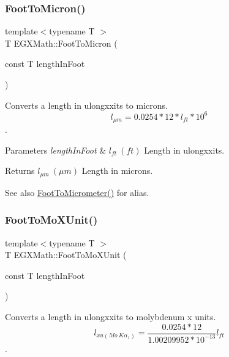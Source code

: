 \subsubsection{\texorpdfstring{Foot\+To\+Micron()}{FootToMicron()}}
{\footnotesize\ttfamily template$<$typename T $>$ \\
T E\+G\+X\+Math\+::\+Foot\+To\+Micron (\begin{DoxyParamCaption}\item[{const T}]{length\+In\+Foot }\end{DoxyParamCaption})}



Converts a length in ulongxxits to microns. \[ l_{\mu m}=0.0254 * 12 * l_{ft} * 10^{6} \]. 


\begin{DoxyParams}{Parameters}
{\em length\+In\+Foot} & $ l_{ft}\ (ft)$ Length in ulongxxits. \\
\hline
\end{DoxyParams}
\begin{DoxyReturn}{Returns}
$ l_{\mu m}\ (\mu m)$ Length in microns. 
\end{DoxyReturn}
\begin{DoxySeeAlso}{See also}
\mbox{\hyperlink{group___e_g_x_math-_conversions-_length_conversions-_imperial-_foot-_s_i_ga2cb67daa37af94d5ddd376a4deda1b0c}{Foot\+To\+Micrometer()}} for alias. 
\end{DoxySeeAlso}
\mbox{\label{group___e_g_x_math-_conversions-_length_conversions-_imperial-_foot-_non-_s_i_ga06bc5f701660697593ed1aacd4abd3d6}} 
\subsubsection{\texorpdfstring{Foot\+To\+Mo\+X\+Unit()}{FootToMoXUnit()}}
{\footnotesize\ttfamily template$<$typename T $>$ \\
T E\+G\+X\+Math\+::\+Foot\+To\+Mo\+X\+Unit (\begin{DoxyParamCaption}\item[{const T}]{length\+In\+Foot }\end{DoxyParamCaption})}



Converts a length in ulongxxits to molybdenum x units. \[ l_{xu(Mo\ K\alpha_1)}=\frac{0.0254 * 12}{1.00209952*10^{-13}} l_{ft}\]. 


